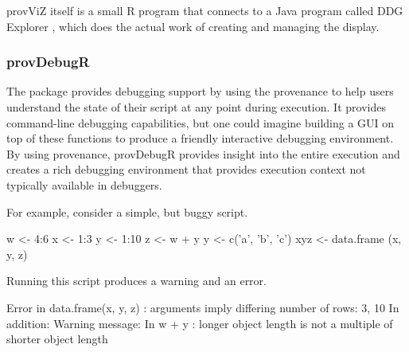 


provViZ itself is a small R program that connects to a Java program called DDG Explorer \citep{Lerner:IPAW14}, which does the actual work of creating and managing the display.  

\subsubsection{provDebugR}

The  package provides debugging support by using the provenance to help users understand the state of their script at any point during execution. It provides command-line debugging capabilities, but one could imagine building a GUI on top of these functions to produce a friendly interactive debugging environment. By using provenance, provDebugR provides insight into the entire execution and creates a rich debugging environment that provides execution context not typically available in debuggers.

For example, consider a simple, but buggy script.
\begin{example}
w <- 4:6
x <- 1:3
y <- 1:10
z <- w + y
y <- c('a', 'b', 'c')
xyz <- data.frame (x, y, z)
\end{example}
Running this script produces a warning and an error.
\begin{example}
Error in data.frame(x, y, z) : 
  arguments imply differing number of rows: 3, 10
In addition: Warning message:
In w + y : longer object length is not a multiple of shorter object length
\end{example}

